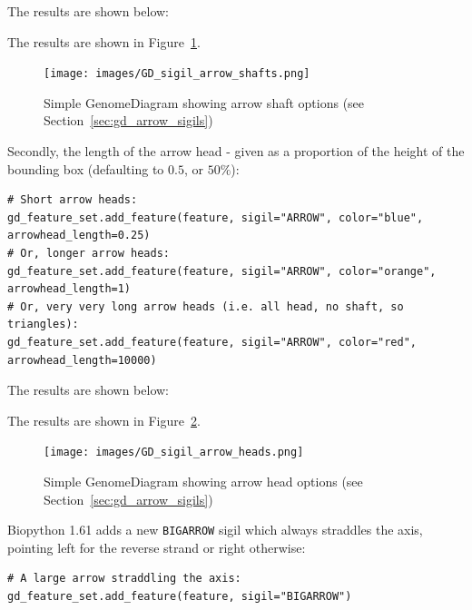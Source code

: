 \begin{htmlonly}
\noindent The results are shown below:


\end{htmlonly}
\begin{latexonly}
\noindent The results are shown in Figure~\ref{fig:gd_sigil_arrow_shafts}.
\begin{figure}[htbp]
\centering
\texttt{[image: images/GD\_sigil\_arrow\_shafts.png]}
\caption{Simple GenomeDiagram showing arrow shaft options
(see Section~\ref{sec:gd_arrow_sigils})}
\label{fig:gd_sigil_arrow_shafts}
\end{figure}
\end{latexonly}

Secondly, the length of the arrow head - given as a proportion of the height
of the bounding box (defaulting to $0.5$, or $50\%$):

\begin{verbatim}
# Short arrow heads:
gd_feature_set.add_feature(feature, sigil="ARROW", color="blue", arrowhead_length=0.25)
# Or, longer arrow heads:
gd_feature_set.add_feature(feature, sigil="ARROW", color="orange", arrowhead_length=1)
# Or, very very long arrow heads (i.e. all head, no shaft, so triangles):
gd_feature_set.add_feature(feature, sigil="ARROW", color="red", arrowhead_length=10000)
\end{verbatim}

\begin{htmlonly}
\noindent The results are shown below:


\end{htmlonly}
\begin{latexonly}
\noindent The results are shown in Figure~\ref{fig:gd_sigil_arrow_heads}.
\begin{figure}[htbp]
\centering
\texttt{[image: images/GD\_sigil\_arrow\_heads.png]}
\caption{Simple GenomeDiagram showing arrow head options
(see Section~\ref{sec:gd_arrow_sigils})}
\label{fig:gd_sigil_arrow_heads}
\end{figure}
\end{latexonly}

Biopython 1.61 adds a new \verb|BIGARROW| sigil which always straddles
the axis, pointing left for the reverse strand or right otherwise:

\begin{verbatim}
# A large arrow straddling the axis:
gd_feature_set.add_feature(feature, sigil="BIGARROW")
\end{verbatim}

